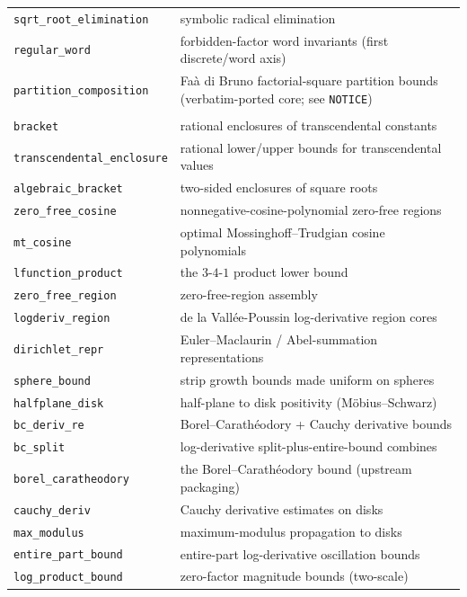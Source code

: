 {\begin{longtable}{@{}p{}p{}@{}}
\texttt{sqrt\_root\_elimination} & symbolic radical elimination \\
\texttt{regular\_word} & forbidden-factor word invariants (first discrete/word axis) \\
\texttt{partition\_composition} & Fa\`a di Bruno factorial-square partition bounds (verbatim-ported core; see \texttt{NOTICE}) \\
\addlinespace
\multicolumn{2}{@{}l}{\emph{Complex analysis: bounds, regions, enclosures}} \\
\texttt{bracket} & rational enclosures of transcendental constants \\
\texttt{transcendental\_enclosure} & rational lower/upper bounds for transcendental values \\
\texttt{algebraic\_bracket} & two-sided enclosures of square roots \\
\texttt{zero\_free\_cosine} & nonnegative-cosine-polynomial zero-free regions \\
\texttt{mt\_cosine} & optimal Mossinghoff--Trudgian cosine polynomials \\
\texttt{lfunction\_product} & the $3$-$4$-$1$ product lower bound \\
\texttt{zero\_free\_region} & zero-free-region assembly \\
\texttt{logderiv\_region} & de la Vall\'ee-Poussin log-derivative region cores \\
\texttt{dirichlet\_repr} & Euler--Maclaurin / Abel-summation representations \\
\texttt{sphere\_bound} & strip growth bounds made uniform on spheres \\
\texttt{halfplane\_disk} & half-plane to disk positivity (M\"obius--Schwarz) \\
\texttt{bc\_deriv\_re} & Borel--Carath\'eodory + Cauchy derivative bounds \\
\texttt{bc\_split} & log-derivative split-plus-entire-bound combines \\
\texttt{borel\_caratheodory} & the Borel--Carath\'eodory bound (upstream packaging) \\
\texttt{cauchy\_deriv} & Cauchy derivative estimates on disks \\
\texttt{max\_modulus} & maximum-modulus propagation to disks \\
\texttt{entire\_part\_bound} & entire-part log-derivative oscillation bounds \\
\texttt{log\_product\_bound} & zero-factor magnitude bounds (two-scale) \\

\end{longtable}}

